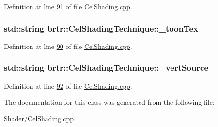 Definition at line \hyperlink{_cel_shading_8cpp_source_l00091}{91} of file \hyperlink{_cel_shading_8cpp_source}{Cel\+Shading.\+cpp}.

\hypertarget{classbrtr_1_1_cel_shading_technique_aca9e9164e2ccb2ce264786399713a8a6}{
\subsubsection[{\+\_\+toon\+Tex}]{\setlength{\rightskip}{0pt plus 5cm}std\+::string brtr\+::\+Cel\+Shading\+Technique\+::\+\_\+toon\+Tex\hspace{0.3cm}{\ttfamily [private]}}}\label{classbrtr_1_1_cel_shading_technique_aca9e9164e2ccb2ce264786399713a8a6}


Definition at line \hyperlink{_cel_shading_8cpp_source_l00090}{90} of file \hyperlink{_cel_shading_8cpp_source}{Cel\+Shading.\+cpp}.

\hypertarget{classbrtr_1_1_cel_shading_technique_a52a36916162a24d0ddd66d371fa04057}{
\subsubsection[{\+\_\+vert\+Source}]{\setlength{\rightskip}{0pt plus 5cm}std\+::string brtr\+::\+Cel\+Shading\+Technique\+::\+\_\+vert\+Source\hspace{0.3cm}{\ttfamily [private]}}}\label{classbrtr_1_1_cel_shading_technique_a52a36916162a24d0ddd66d371fa04057}


Definition at line \hyperlink{_cel_shading_8cpp_source_l00092}{92} of file \hyperlink{_cel_shading_8cpp_source}{Cel\+Shading.\+cpp}.



The documentation for this class was generated from the following file\+:\begin{DoxyCompactItemize}
\item 
Shader/\hyperlink{_cel_shading_8cpp}{Cel\+Shading.\+cpp}\end{DoxyCompactItemize}
